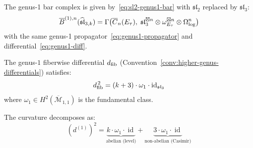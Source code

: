 The genus-1 bar complex is given by~\eqref{eq:sl2-genus1-bar} with $\mathfrak{sl}_2$ replaced by $\mathfrak{sl}_3$:
\begin{equation}\label{eq:sl3-genus1-bar}
\overline{B}^{(1),n}(\widehat{\mathfrak{sl}}_{3,k}) = \Gamma\bigl(\overline{C}_n(E_\tau),\; \mathfrak{sl}_3^{\boxtimes n} \otimes \omega_{E_\tau}^{\boxtimes n} \otimes \Omega^n_{\log}\bigr)
\end{equation}
with the same genus-1 propagator~\eqref{eq:genus1-propagator} and differential~\eqref{eq:genus1-diff}.

\begin{theorem}
\label{thm:sl3-genus1-curvature}
The genus-$1$ fiberwise differential
$d_{\mathrm{fib}}$ \textup{(}Convention~\textup{\ref{conv:higher-genus-differentials})} satisfies:
\begin{equation}\label{eq:sl3-genus1-dsquared}
d_{\mathrm{fib}}^{\,2} = (k+3) \cdot \omega_1 \cdot \operatorname{id}_{\mathfrak{sl}_3}
\end{equation}
where $\omega_1 \in H^2(\overline{\mathcal{M}}_{1,1})$ is the fundamental class.

The curvature decomposes as:
\begin{equation}\label{eq:sl3-curvature-decomposition}
(d^{(1)})^2 = \underbrace{k \cdot \omega_1 \cdot \operatorname{id}}_{\text{abelian (level)}} + \underbrace{3 \cdot \omega_1 \cdot \operatorname{id}}_{\text{non-abelian (Casimir)}}
\end{equation}
\end{theorem}

